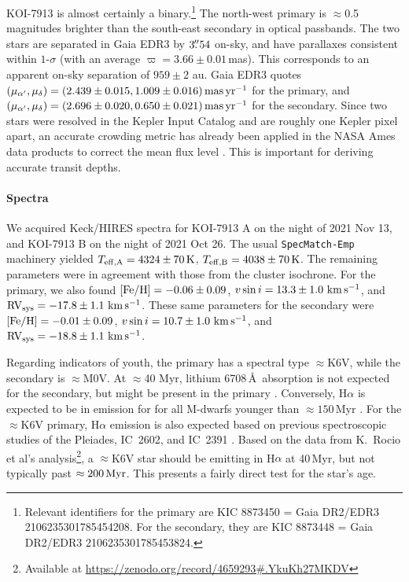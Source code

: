 \documentclass[12pt,twocolumn,linenumbers]{aastex63}
\newcommand{\mkms}{{\rm \,km\,s^{-1}}}  %
\begin{document}
KOI-7913 is almost certainly a binary.\footnote{Relevant identifiers for the
primary are KIC 8873450 = Gaia DR2/EDR3 2106235301785454208.  For the
secondary, they are KIC 8873448 = Gaia DR2/EDR3 2106235301785453824.}
The north-west primary is $\approx$0.5 magnitudes brighter than the
south-east secondary in optical passbands.  The two stars are
separated in Gaia EDR3 by $3\mbox{$.\!\!^{\prime\prime}$}54$ on-sky, and have parallaxes
consistent within $1$-$\sigma$ (with an average $\varpi=3.66 \pm
0.01$\,mas).  This corresponds to an apparent on-sky separation of
$959 \pm 2$ au.  Gaia EDR3 quotes
$(\mu_{\alpha'},\mu_\delta)=(2.439\pm0.015, 1.009\pm 0.016)\,{\rm
mas}\,{\rm yr}^{-1}$ for the primary, and
$(\mu_{\alpha'},\mu_\delta)=(2.696\pm0.020, 0.650 \pm 0.021) \,{\rm
mas}\,{\rm yr}^{-1}$ for the secondary.  Since two stars were resolved
in the Kepler Input Catalog and are roughly one Kepler pixel apart, an
accurate crowding metric has already been applied in the NASA Ames
data products to correct the mean flux level
\citep{2017ksci.rept....6M}.  This is important for deriving accurate
transit depths.

\paragraph{Spectra}

We acquired Keck/HIRES spectra for KOI-7913 A on the night of 2021 Nov
13, and KOI-7913 B on the night of 2021 Oct 26.  The usual
\texttt{SpecMatch-Emp} \citep{yee_SM_2017} machinery yielded $T_{\rm
eff,A} = 4324 \pm 70\,{\rm K}$, $T_{\rm eff,B} = 4038 \pm 70\,{\rm
K}$.  The remaining parameters were in agreement with those from the
cluster isochrone.  For the primary, we also found $[{\rm Fe/H}]=
-0.06 \pm 0.09$, $v\sin i = 13.3 \pm 1.0\,\mkms$, and ${\rm RV}_{\rm
sys} = -17.8 \pm 1.1\,\mkms$.  These same parameters for the secondary
were $[{\rm Fe/H}]= -0.01 \pm 0.09$, $v\sin i = 10.7 \pm 1.0\,\mkms$,
and ${\rm RV}_{\rm sys} = -18.8 \pm 1.1\,\mkms$.


Regarding indicators of youth, the primary has a spectral type
$\approx$K6V, while the secondary is $\approx$M0V.  At $\approx$40
Myr, lithium 6708\,\AA\ absorption is not expected for the secondary,
but might be present in the primary \citep[{\it
e.g.},][Figure~8]{soderblom_ages_2014}.  Conversely, H$\alpha$ is
expected to be in emission for for all M-dwarfs younger than
$\approx150$\,Myr \citep[{\it e.g.},][]{kiman_calibration_2021}.  For
the $\approx$K6V primary, H$\alpha$ emission is also expected based on
previous spectroscopic studies of the Pleiades, IC~2602, and IC~2391
\citep[{\it e.g.},][their Figure~8]{stauffer_rotational_1997}.  Based
on the data from K.~Rocio et al's analysis\footnote{Available at
\url{https://zenodo.org/record/4659293\#.YkuKh27MKDV}}, a $\approx$K6V
star should be emitting in H$\alpha$ at 40\,Myr, but not typically
past $\approx200\,{\rm Myr}$.  This presents a fairly direct test for
the star's age.
\end{document}
